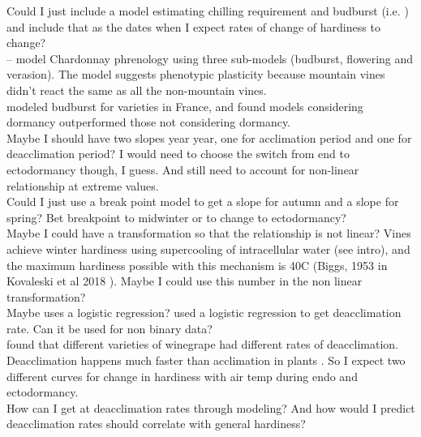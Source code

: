 \documentclass[11pt,letter]{article}
\begin{document}
Could I just include a model estimating chilling requirement and budburst (i.e. \cite{Caffarra2010}) and include that as the dates when I expect rates of change of hardiness to change? \\

\cite{Caffarra2010} – model Chardonnay phrenology using three sub-models (budburst, flowering and verasion). The model suggests phenotypic plasticity because mountain vines didn't react the same as all the non-mountain vines. \\  

\cite{Cortazar-Atauri2009} modeled budburst for varieties in France, and found models considering dormancy outperformed those not considering dormancy. \\  

Maybe I should have two slopes year year, one for acclimation period and one for deacclimation period? I would need to choose the switch from end to ectodormancy though, I guess. And still need to account for non-linear relationship at extreme values. \\ 

Could I just use a break point model to get a slope for autumn and a slope for spring? Bet breakpoint to midwinter or to change to ectodormancy? \\

Maybe I could have a transformation so that the relationship is not linear? Vines achieve winter hardiness using supercooling of intracellular water (see \cite{Kovaleski2018a} intro), and the maximum hardiness possible with this mechanism is 40\textdegree C (Biggs, 1953 in Kovaleski et al 2018 ). Maybe I could use this number in the non linear transformation? \\

Maybe uses a logistic regression? \cite{Kovaleski2018a} used a logistic regression to get deacclimation rate. Can it be used for non binary data?\\

\cite{Kovaleski2018a} found that different varieties of winegrape had different rates of deacclimation. \\ 

Deacclimation happens much faster than acclimation in plants \citep{Kalberer2006}. So I expect two different curves for change in hardiness with air temp during endo and ectodormancy. \\ 

How can I get at deacclimation rates through modeling? And how would I predict deacclimation rates should correlate with general hardiness?\\
\end{document}
